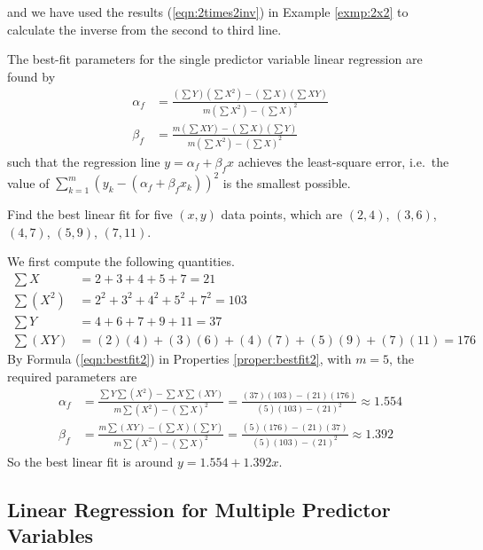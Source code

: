 and we have used the results (\ref{eqn:2times2inv}) in Example \ref{exmp:2x2} to calculate the inverse from the second to third line.
\begin{proper}
\label{proper:bestfit2}
The best-fit parameters for the single predictor variable linear regression are found by
\begin{subequations}
\label{eqn:bestfit2}
\begin{align}
\alpha_f &= \frac{(\sum Y) (\sum X^2) - (\sum X) (\sum XY)}{m(\sum X^2) - (\sum X)^2} \\
\beta_f &= \frac{m (\sum XY) - (\sum X) (\sum Y)}{m(\sum X^2) - (\sum X)^2}
\end{align}    
\end{subequations}
such that the regression line $y = \alpha_f + \beta_f x$ achieves the least-square error, i.e.\ the value of $\sum_{k=1}^m (y_k - (\alpha_f + \beta_f x_k))^2$ is the smallest possible.
\end{proper}
\begin{exmp}
\label{ex11.1.1}
Find the best linear fit for five $(x,y)$ data points, which are $(2,4)$, $(3,6)$, $(4,7)$, $(5,9)$, $(7,11)$.
\end{exmp}
\begin{solution}
We first compute the following quantities.
\begin{align*}
\sum X &= 2+3+4+5+7 = 21 \\
\sum(X^2) &= 2^2+3^2+4^2+5^2+7^2 = 103 \\
\sum Y &= 4+6+7+9+11 = 37 \\
\sum (XY) &= (2)(4)+(3)(6)+(4)(7)+(5)(9)+(7)(11) = 176
\end{align*}
By Formula (\ref{eqn:bestfit2}) in Properties \ref{proper:bestfit2}, with $m=5$, the required parameters are
\begin{align*}
\alpha_f &= \frac{\sum Y \sum (X^2) - \sum X \sum (XY)}{m\sum(X^2) - (\sum X)^2} = \frac{(37)(103)-(21)(176)}{(5)(103)-(21)^2} \approx 1.554 \\
\beta_f &= \frac{m \sum(XY) - (\sum X) (\sum Y)}{m\sum(X^2) - (\sum X)^2} = \frac{(5)(176)-(21)(37)}{(5)(103)-(21)^2} \approx 1.392
\end{align*}
So the best linear fit is around $y = 1.554 + 1.392x$.
\end{solution}

\subsection{Linear Regression for Multiple Predictor Variables}

